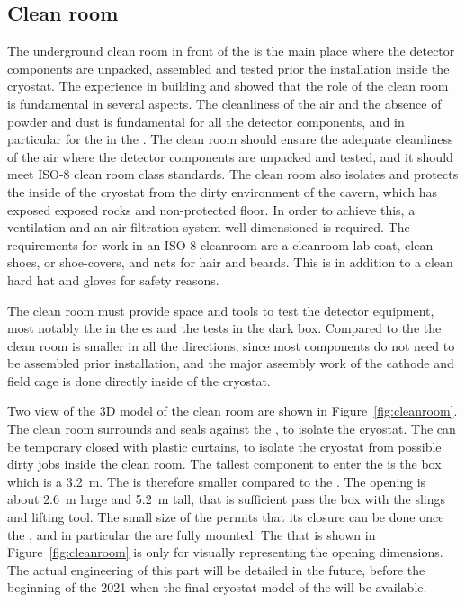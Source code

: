 \subsection{Clean room}
The underground clean room in front of the  is the main place where the detector components are unpacked, assembled and tested prior the installation inside the cryostat.
The experience in building  and  showed that the role of the clean room is fundamental in several aspects.
The cleanliness of the air and the absence of powder and dust is fundamental for all the detector components, and in particular for the  in the .
The clean room should ensure the adequate cleanliness of the air where the detector components are unpacked and tested, and it should meet ISO-8 clean room class standards.
The clean room also isolates and protects the inside of the cryostat from the dirty environment of the cavern, which has exposed exposed rocks and non-protected floor.
In order to achieve this, a ventilation and an air filtration system well dimensioned is required.
The requirements for work in an ISO-8 cleanroom are a cleanroom lab coat, clean shoes, or shoe-covers, and nets for hair and beards.
This is in addition to a clean hard hat and gloves for safety reasons.

The clean room must provide space and tools to test the detector equipment, most notably the  in the  \coldbox{}es and the  tests in the dark box.
Compared to the  the clean room is smaller in all the directions, since most components do not need to be assembled prior installation, and the major assembly work of the cathode and field cage is done directly inside of the cryostat.

Two view of the 3D model of the clean room are shown in Figure~\ref{fig:cleanroom}.
The clean room surrounds and seals against the , to isolate the cryostat.
The  can be temporary closed with plastic curtains, to isolate the cryostat from possible dirty jobs inside the clean room.
The tallest component to enter the  is the  box which is a 3.2~m.
The  is therefore smaller compared to the .
The opening is about 2.6~m large and 5.2~m tall, that is sufficient pass the  box with the slings and lifting tool.
The small size of the  permits that its closure can be done once the , and in particular the  are fully mounted.
The  that is shown in Figure~\ref{fig:cleanroom} is only for visually representing the opening dimensions.
The actual engineering of this part will be detailed in the future, before the beginning of the 2021 when the final cryostat model of the  will be available.

